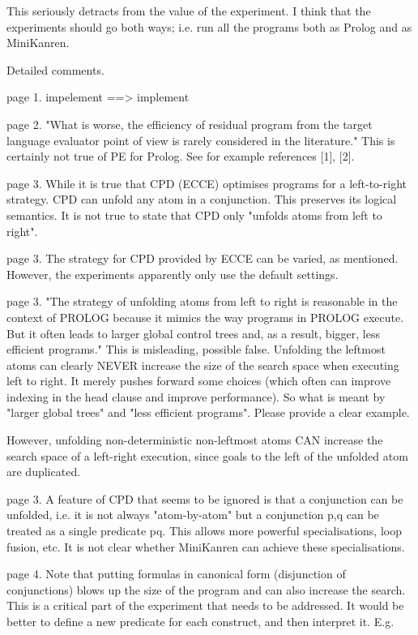 This seriously detracts from the value of the experiment. I think that the experiments should go both ways; i.e. run all the programs both as Prolog and as MiniKanren.



Detailed comments.

page 1. impelement ==> implement

page 2.  "What is worse, the efficiency of residual program from the target language evaluator point of view is rarely considered in the literature." This is certainly not true of PE for Prolog.  See for example references [1], [2].

page 3.  While it is true that CPD (ECCE) optimises programs for a left-to-right strategy. CPD can unfold any atom in a conjunction.  This preserves its logical semantics.  It is not true to state that CPD only "unfolds atoms from left to right".

page 3.  The strategy for CPD provided by ECCE can be varied, as mentioned.  However, the experiments apparently only use the default settings.

page 3. "The strategy of unfolding atoms from left to right is reasonable in the context of PROLOG because it mimics the way programs in PROLOG execute. But it often leads to larger global control trees and, as a result, bigger, less efficient programs."  This is misleading, possible false.  Unfolding the leftmost atoms can clearly NEVER increase the size of the search space when executing left to right.  It merely pushes forward some choices (which often can improve indexing in the head clause and improve performance). So what is meant by "larger global trees" and "less efficient programs". Please provide a clear example.

However, unfolding non-deterministic non-leftmost atoms CAN increase the search space of a left-right execution, since goals to the left of the unfolded atom are duplicated.


page 3. A feature of CPD that seems to be ignored is that a conjunction can be unfolded, i.e. it is not always "atom-by-atom" but a conjunction p,q can be treated as a single predicate pq.  This allows more powerful specialisations, loop fusion, etc.  It is not clear whether MiniKanren can achieve these specialisations.


page 4.  Note that putting formulas in canonical form (disjunction of conjunctions) blows up the size of the program and can also increase the search.  This is a critical part of the experiment that needs to be addressed.  It would be better to define a new predicate for each construct, and then interpret it.  E.g.

